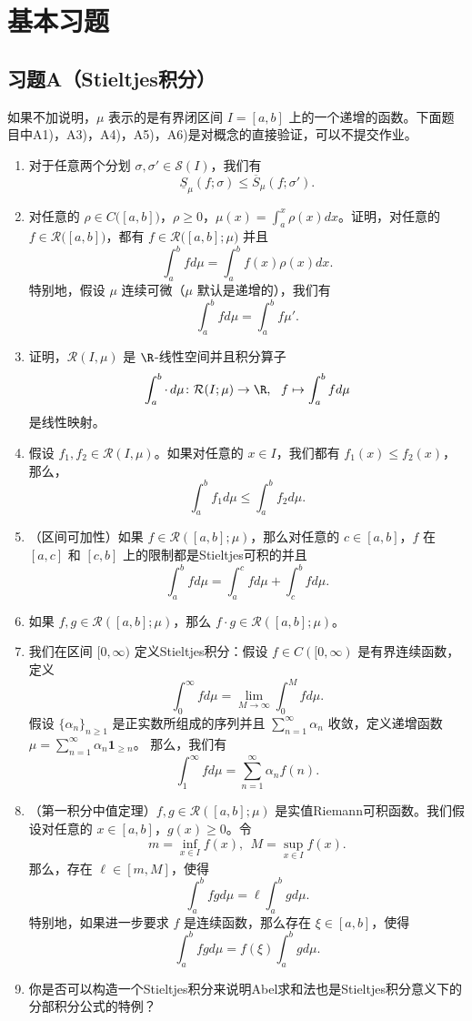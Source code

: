 \section{基本习题}
\subsection{习题A（Stieltjes积分）}
如果不加说明，$\mu$ 表示的是有界闭区间 $I=[a,b]$ 上的一个递增的函数。下面题目中A1)，A3)，A4)，A5)，A6)是对概念的直接验证，可以不提交作业。
\begin{enumerate}[label=A\arabic*)]
\item 对于任意两个分划 $\sigma,\sigma' \in \mathcal{S}(I)$，我们有
\[\underline{S}_\mu(f;\sigma)\leqslant \overline{S}_\mu(f;\sigma').\]
\item 对任意的 $\rho\in C\bigl([a,b]\bigr)$，$\rho \geqslant 0$，$\mu(x)=\displaystyle\int_a^x \rho(x)dx$。证明，对任意的 $f\in \mathcal{R}\bigl([a,b]\bigr)$，都有 $f\in \mathcal{R}\bigl([a,b];\mu\bigr)$ 并且
\[\int_a^b fd\mu= \int_a^b f(x)\rho(x)dx.\]
特别地，假设 $\mu$ 连续可微（$\mu$ 默认是递增的），我们有
\[\int_a^b f d\mu = \int_a^b f \mu'.\]
\item 证明，$\mathcal{R}(I,\mu)$ 是 $\R$-线性空间并且积分算子
\[\displaystyle \int_{a}^b\cdot \,d\mu\colon  \mathcal{R}(I;\mu)\rightarrow \R,\ \  f \mapsto \int_a^b fd\mu\]
是线性映射。
\item 假设 $f_1,f_2\in \mathcal{R}(I,\mu)$。如果对任意的 $x\in I$，我们都有 $f_1(x) \leqslant f_2(x)$，那么，
\[\int_a^b f_1d\mu \leqslant \int_a^b f_2d\mu.\]
\item （区间可加性）如果 $f\in \mathcal{R}([a,b];\mu)$，那么对任意的 $c\in [a,b]$，$f$ 在 $[a,c]$ 和 $[c,b]$ 上的限制都是Stieltjes可积的并且
\[\int_a^b f d\mu=\int_a^c f d\mu+\int_c^b fd\mu.\]
\item 如果 $f,g\in  \mathcal{R}([a,b];\mu)$，那么 $f\cdot g\in  \mathcal{R}([a,b];\mu)$。
\item 我们在区间 $[0,\infty)$ 定义Stieltjes积分：假设 $f\in C([0,\infty)$ 是有界连续函数，定义
\[\int_0^\infty f d\mu= \lim_{M\rightarrow \infty}\int_0^M f d\mu.\]
假设 $\{\alpha_n\}_{n\geqslant 1}$ 是正实数所组成的序列并且 $\displaystyle \sum_{n=1}^\infty \alpha_n$ 收敛，定义递增函数 $\mu =\displaystyle\sum_{n=1}^\infty \alpha_n \mathbf{1}_{\geqslant n}$。
那么，我们有
\[\int_1^\infty fd\mu = \sum_{n=1}^\infty \alpha_n f(n).\]
\item （第一积分中值定理）$f, g\in \mathcal{R}([a,b];\mu)$ 是实值Riemann可积函数。我们假设对任意的 $x\in [a,b]$，$g(x)\geqslant 0$。令
\[m=\displaystyle \inf_{x\in I} f(x), \ \ M=\displaystyle \sup_{x\in I} f(x).\]
那么，存在 $\ell \in [m,M]$，使得
\[\int_a^b fgd\mu= \ell \int_{a}^b gd\mu.\]
特别地，如果进一步要求 $f$ 是连续函数，那么存在 $\xi \in [a,b]$，使得
\[\displaystyle \int_a^b fgd\mu= f(\xi) \int_{a}^b gd\mu.\]
\item 你是否可以构造一个Stieltjes积分来说明Abel求和法也是Stieltjes积分意义下的分部积分公式的特例？
\end{enumerate}

